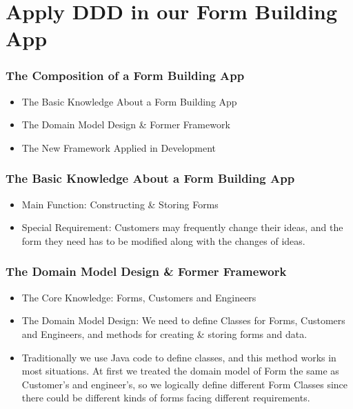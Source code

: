 \documentclass{beamer}
\begin{document}
\section{Apply DDD in our Form Building App}

\begin{frame}
\frametitle{The Composition of a Form Building App}

\begin{itemize}
    \item The Basic Knowledge About a Form Building App
    \item The Domain Model Design \& Former Framework
    \item The New Framework Applied in Development
\end{itemize}

\end{frame}

\begin{frame}
\frametitle{The Basic Knowledge About a Form Building App}

\begin{itemize}
    \item Main Function: Constructing \& Storing Forms
    \item Special Requirement: Customers may frequently change their ideas, and the form they need has to be modified along with the changes of ideas.
\end{itemize}

\end{frame}

\begin{frame}
\frametitle{The Domain Model Design \& Former Framework}
\begin{itemize}
    \item <1-> The Core Knowledge: Forms, Customers and Engineers
    \item <2-> The Domain Model Design: We need to define Classes for Forms, Customers and Engineers, and methods for creating \& storing forms and data.
    \item <3-> Traditionally we use Java code to define classes, and this method works in most situations. At first we treated the domain model of Form the same as Customer's and engineer's, so we logically define different Form Classes since there could be different kinds of forms facing different requirements. 
\end{itemize}

\end{frame}
\end{document}
